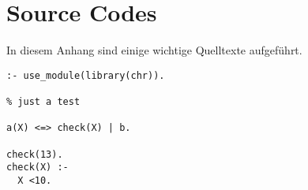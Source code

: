 \chapter{Source Codes}

In diesem Anhang sind einige wichtige Quelltexte aufgeführt.

\begin{lstlisting}
:- use_module(library(chr)).

% just a test

a(X) <=> check(X) | b.

check(13).
check(X) :-
  X <10.
\end{lstlisting}
